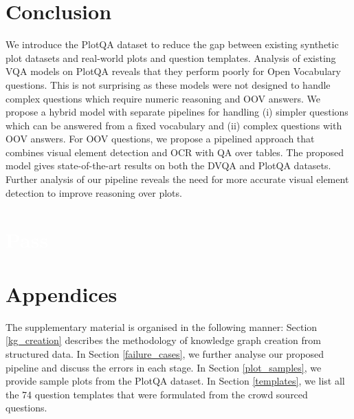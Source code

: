 \documentclass[10pt,twocolumn,letterpaper]{article}
\begin{document}
\section{Conclusion}
We introduce the PlotQA dataset to reduce the gap between existing synthetic plot datasets and real-world plots and question templates.
Analysis of existing VQA models on PlotQA reveals that they perform poorly for Open Vocabulary questions. This is not surprising as these models were not designed to handle complex questions which require numeric reasoning and OOV answers. We propose a hybrid model with separate pipelines for handling (i) simpler questions which can be answered from a fixed vocabulary and (ii) complex questions with OOV answers. For OOV questions, we propose a pipelined approach that combines visual element detection and OCR with QA over tables. The proposed model gives state-of-the-art results on both the DVQA and PlotQA datasets. 
Further analysis of our pipeline reveals the need for more accurate visual element detection to improve reasoning over plots.























{\small


}

\newpage









\section*{\textcolor{white}{Pass}}
\newpage
\section*{Appendices}
The supplementary material is organised in the following manner:
Section \ref{kg_creation} describes the methodology of knowledge graph creation from structured data.
In Section \ref{failure_cases}, we further analyse our proposed pipeline and discuss the errors in each stage.
In Section \ref{plot_samples}, we provide sample plots from the PlotQA dataset.
In Section \ref{templates}, we list all the 74 question templates that were formulated from the crowd sourced questions.
\end{document}
